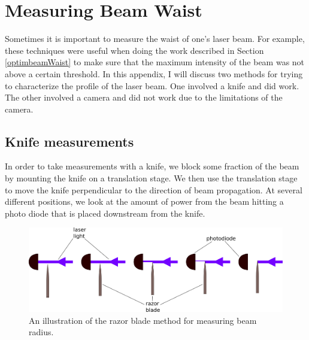 \chapter{Measuring Beam Waist}
\label{BeamWaistAppendix}

Sometimes it is important to measure the waist of one's laser beam. For example, these techniques were useful when doing the work described in Section\,\ref{optimbeamWaist} to make sure that the maximum intensity of the beam was not above a certain threshold. In this appendix, I will discuss two methods for trying to characterize the profile of the laser beam. One involved a knife and did work. The other involved a camera and did not work due to the limitations of the camera.  

\section{Knife measurements}
In order to take measurements with a knife, we block some fraction of the beam by mounting the knife on a translation stage. We then use the translation stage to move the knife perpendicular to the direction of beam propagation. At several different positions, we look at the amount of power from the beam hitting a photo diode that is placed downstream from the knife. 
\begin{figure}
\includegraphics[width=.95\textwidth]{knife_drawing}
\caption[Knife diagram]{\label{knifeDiagram} An illustration of the razor blade method for measuring beam radius.
}
\end{figure}

